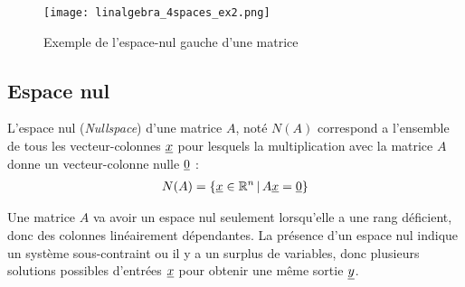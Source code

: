 \begin{example}
\begin{figure}[H]
	\centering
		\texttt{[image: linalgebra\_4spaces\_ex2.png]}
	\caption{Exemple de l'espace-nul gauche d'une matrice}
	\label{fig:4spaces_ex2}
\end{figure}
\end{example}



\subsection{Espace nul}
\label{sec:nullspace}

L'espace nul (\textit{Nullspace}) d'une matrice $A$, noté $N(A)$ correspond a l'ensemble de tous les vecteur-colonnes $\underline{x}$ pour lesquels la multiplication avec la matrice $A$ donne un vecteur-colonne nulle $\underline{0}$ :
\begin{align}
N(A) = \left\{ \underline{x} \in \mathbb{R}^n \,|\, A\underline{x} = \underline{0} \right\}
\end{align}

Une matrice $A$ va avoir un espace nul seulement lorsqu'elle a une rang déficient, donc des colonnes linéairement dépendantes. La présence d'un espace nul indique un système sous-contraint ou il y a un surplus de variables, donc plusieurs solutions possibles d'entrées $\underline{x}$ pour obtenir une même sortie $\underline{y}$. 
%
%

